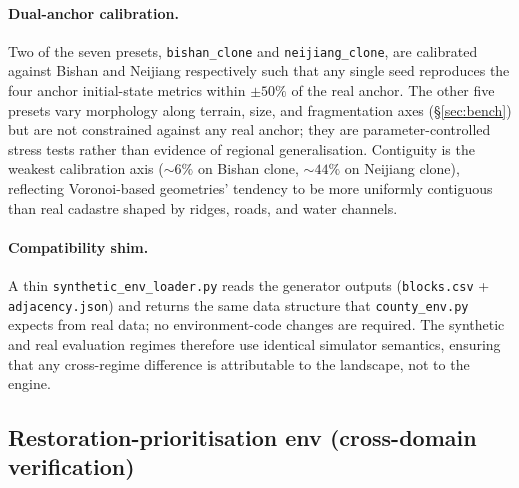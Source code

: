 \documentclass[11pt]{article}
\begin{document}
\paragraph{Dual-anchor calibration.} Two of the seven presets, \texttt{bishan\_clone} and \texttt{neijiang\_clone}, are calibrated against Bishan and Neijiang respectively such that any single seed reproduces the four anchor initial-state metrics within $\pm 50\%$ of the real anchor. The other five presets vary morphology along terrain, size, and fragmentation axes (\S\ref{sec:bench}) but are not constrained against any real anchor; they are parameter-controlled stress tests rather than evidence of regional generalisation. Contiguity is the weakest calibration axis ($\sim$$6\%$ on Bishan clone, $\sim$$44\%$ on Neijiang clone), reflecting Voronoi-based geometries' tendency to be more uniformly contiguous than real cadastre shaped by ridges, roads, and water channels.

\paragraph{Compatibility shim.} A thin \texttt{synthetic\_env\_loader.py} reads the generator outputs (\texttt{blocks.csv} + \texttt{adjacency.json}) and returns the same data structure that \texttt{county\_env.py} expects from real data; no environment-code changes are required. The synthetic and real evaluation regimes therefore use identical simulator semantics, ensuring that any cross-regime difference is attributable to the landscape, not to the engine.

\subsection{Restoration-prioritisation env (cross-domain verification)}\label{sec:methods-restoration}
\end{document}
